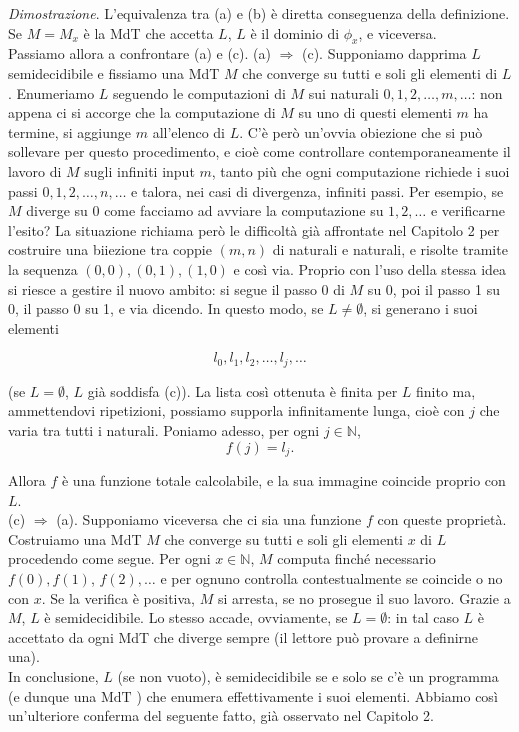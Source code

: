 \textit{Dimostrazione}. L'equivalenza tra (a) e (b) è diretta conseguenza della
definizione. Se $M=M_x$ è la MdT che accetta $L$, $L$ è il dominio di $\phi_x$, e
viceversa.\\ Passiamo allora a confrontare (a) e (c).
(a) $\Rightarrow$ (c). Supponiamo dapprima $L$ semidecidibile e fissiamo una MdT
$M$ che converge su tutti e soli gli elementi di $L$. Enumeriamo $L$ seguendo le
computazioni di $M$ sui naturali $0,1,2, \ldots, m, \ldots$: non appena ci si
accorge che la computazione di $M$ su uno di questi elementi $m$ ha termine, si
aggiunge $m$ all'elenco di $L$. C'è però un'ovvia obiezione che si può sollevare
per questo procedimento, e cioè come controllare contemporaneamente il lavoro di
$M$ sugli infiniti input $m$, tanto più che ogni computazione richiede i suoi
passi $0,1,2, \ldots, n, \ldots$ e talora, nei casi di divergenza, infiniti
passi. Per esempio, se $M$ diverge su 0 come facciamo ad avviare la computazione
su $1,2, \ldots$ e verificarne l'esito? La situazione richiama però le
difficoltà già affrontate nel Capitolo 2 per costruire una biiezione tra coppie
$(m, n)$ di naturali e naturali, e risolte tramite la sequenza
$(0,0),(0,1),(1,0)$ e così via. Proprio con l'uso della stessa idea si riesce a
gestire il nuovo ambito: si segue il passo 0 di $M$ su 0, poi il passo 1 su 0,
il passo 0 su 1, e via dicendo. In questo modo, se $L \neq \emptyset$, si
generano i suoi elementi

\[
    l_0, l_1, l_2, \ldots, l_j, \ldots
\]

(se $L=\emptyset$, $L$ già soddisfa (c)). La lista così ottenuta è finita per $L$
finito ma, ammettendovi ripetizioni, possiamo supporla infinitamente lunga, cioè
con $j$ che varia tra tutti i naturali. Poniamo adesso, per ogni $j \in
    \mathbb{N}$,
\[
    f(j)=l_j .
\]

Allora $f$ è una funzione totale calcolabile, e la sua immagine coincide proprio
con $L$.\\

(c) $\Rightarrow$ (a). Supponiamo viceversa che ci sia una funzione $f$
con queste proprietà. Costruiamo una MdT $M$ che converge su
tutti e soli gli elementi $x$ di $L$ procedendo come segue. Per ogni $x \in
    \mathbb{N}$, $M$ computa finché necessario $f(0), f(1)$, $f(2), \ldots$ e per
ognuno controlla contestualmente se coincide o no con $x$. Se la verifica è
positiva, $M$ si arresta, se no prosegue il suo lavoro. Grazie a $M$, $L$ è
semidecidibile. Lo stesso accade, ovviamente, se $L=\emptyset$: in tal caso $L$
è accettato da ogni MdT che diverge sempre (il lettore può provare a definirne
una).\\
In conclusione, $L$ (se non vuoto), è semidecidibile se e solo se c'è un
programma (e dunque una $\mathrm{MdT}$ ) che enumera effettivamente i suoi
elementi. Abbiamo così un'ulteriore conferma del seguente fatto, già osservato
nel Capitolo 2.

